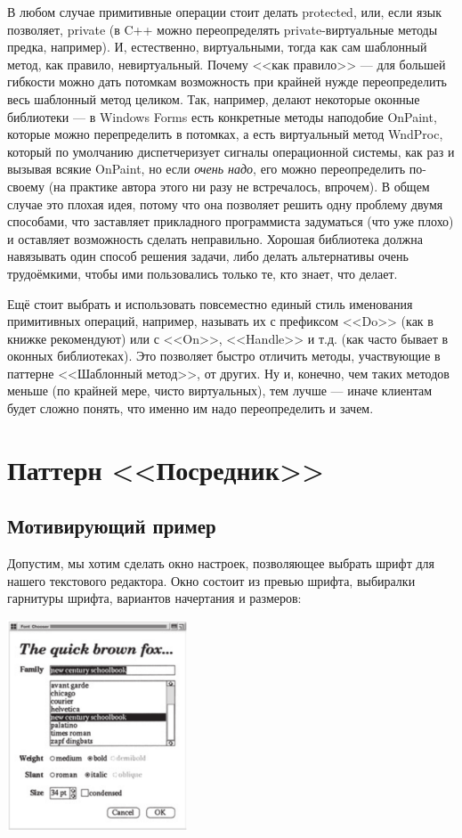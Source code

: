 \documentclass{../text-style}
\begin{document}
В любом случае примитивные операции стоит делать protected, или, если язык позволяет, private (в C++ можно переопределять private-виртуальные методы предка, например). И, естественно, виртуальными, тогда как сам шаблонный метод, как правило, невиртуальный. Почему <<как правило>> --- для большей гибкости можно дать потомкам возможность при крайней нужде переопределить весь шаблонный метод целиком. Так, например, делают некоторые оконные библиотеки --- в Windows Forms есть конкретные методы наподобие OnPaint, которые можно перепределить в потомках, а есть виртуальный метод WndProc, который по умолчанию диспетчеризует сигналы операционной системы, как раз и вызывая всякие OnPaint, но если \emph{очень надо}, его можно переопределить по-своему (на практике автора этого ни разу не встречалось, впрочем). В общем случае это плохая идея, потому что она позволяет решить одну проблему двумя способами, что заставляет прикладного программиста задуматься (что уже плохо) и оставляет возможность сделать неправильно. Хорошая библиотека должна навязывать один способ решения задачи, либо делать альтернативы очень трудоёмкими, чтобы ими пользовались только те, кто знает, что делает.

Ещё стоит выбрать и использовать повсеместно единый стиль именования примитивных операций, например, называть их с префиксом <<Do>> (как в книжке рекомендуют) или с <<On>>, <<Handle>> и т.д. (как часто бывает в оконных библиотеках). Это позволяет быстро отличить методы, участвующие в паттерне <<Шаблонный метод>>, от других. Ну и, конечно, чем таких методов меньше (по крайней мере, чисто виртуальных), тем лучше --- иначе клиентам будет сложно понять, что именно им надо переопределить и зачем.

\section{Паттерн <<Посредник>>}

\subsection{Мотивирующий пример}

Допустим, мы хотим сделать окно настроек, позволяющее выбрать шрифт для нашего текстового редактора. Окно состоит из превью шрифта, выбиралки гарнитуры шрифта, вариантов начертания и размеров:

\begin{center}
    \includegraphics[width=0.4\textwidth]{mediatorMotivation.png}
\end{center}
\end{document}
